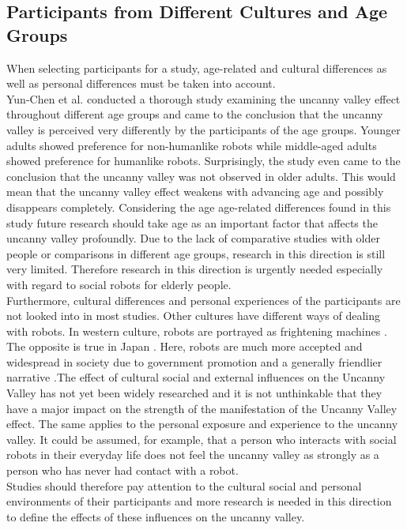 \subsection{Participants from Different Cultures and Age Groups}
When selecting participants for a study, age-related and cultural differences as well as personal differences must be taken into account.\\
Yun-Chen et al. \cite{age_differences} conducted a thorough study examining the uncanny valley effect throughout different age groups and came to the conclusion that the uncanny valley is perceived very differently by the participants of the age groups. Younger adults
showed preference for non-humanlike robots while middle-aged adults showed preference for humanlike robots. Surprisingly, the study even came to the conclusion that the uncanny valley was not observed in older adults. This would mean that the uncanny valley effect weakens with advancing age and possibly disappears completely. Considering the age age-related differences
found in this study future research should take age as an important factor that affects the uncanny valley profoundly. Due to the lack of comparative studies with older people or comparisons in different age groups, research in this direction is still very limited. Therefore research in this direction is urgently needed especially with regard to social robots for elderly people.\\
Furthermore, cultural differences and personal experiences of the participants are not looked into in most studies. Other cultures have different ways of dealing with robots. In western culture, robots are portrayed as frightening machines \cite{japan_robot_friendly}. The opposite is true in Japan \cite{japan_robot_friendly}. Here, robots are much more accepted and widespread in society due to government promotion and a generally friendlier narrative \cite{japan_robot_friendly}.The effect of cultural social and external influences on the Uncanny Valley has not yet been widely researched and it is not unthinkable that they have a major impact on the strength of the manifestation of the Uncanny Valley effect. The same applies to the personal exposure and experience to the uncanny valley. It could be assumed, for example, that a person who interacts with social robots in their everyday life does not feel the uncanny valley as strongly as a person who has never had contact with a robot.\\
Studies should therefore pay attention to the cultural social and personal environments of their participants and more research is needed in this direction to define the effects of these influences on the uncanny valley. 







